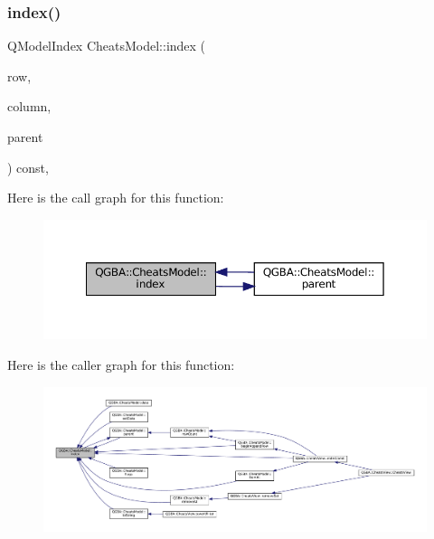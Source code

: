 \subsubsection{\texorpdfstring{index()}{index()}}
{\footnotesize\ttfamily Q\+Model\+Index Cheats\+Model\+::index (\begin{DoxyParamCaption}\item[{\mbox{\hyperlink{ioapi_8h_a787fa3cf048117ba7123753c1e74fcd6}{int}}}]{row,  }\item[{\mbox{\hyperlink{ioapi_8h_a787fa3cf048117ba7123753c1e74fcd6}{int}}}]{column,  }\item[{const Q\+Model\+Index \&}]{parent }\end{DoxyParamCaption}) const\hspace{0.3cm}{\ttfamily [override]}, {\ttfamily [virtual]}}

Here is the call graph for this function\+:
\nopagebreak
\begin{figure}[H]
\begin{center}
\leavevmode
\includegraphics[width=350pt]{class_q_g_b_a_1_1_cheats_model_a55247862e978913005dfae95e0f3753c_cgraph}
\end{center}
\end{figure}
Here is the caller graph for this function\+:
\nopagebreak
\begin{figure}[H]
\begin{center}
\leavevmode
\includegraphics[width=350pt]{class_q_g_b_a_1_1_cheats_model_a55247862e978913005dfae95e0f3753c_icgraph}
\end{center}
\end{figure}
\mbox{\label{class_q_g_b_a_1_1_cheats_model_a5c3aad6f6819464b8f55510cb4ae69df}} 
